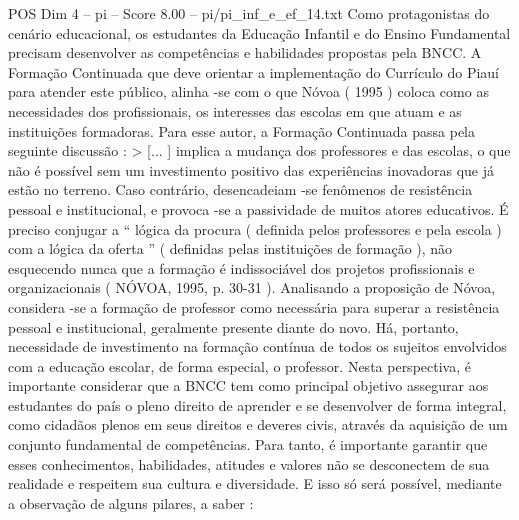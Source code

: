 \begin{textsample}{POS Dim 4 – pi – Score 8.00 – pi/pi\_inf\_e\_ef\_14.txt}
Como protagonistas do cenário educacional, os estudantes da Educação Infantil e do Ensino Fundamental precisam desenvolver as competências e habilidades propostas pela BNCC.
A Formação Continuada que deve orientar a implementação do Currículo do Piauí para atender este público, alinha -se com o que Nóvoa ( 1995 ) coloca como as necessidades dos profissionais, os interesses das escolas em que atuam e as instituições formadoras.
Para esse autor, a Formação Continuada passa pela seguinte discussão : > [... ] implica a mudança dos professores e das escolas, o que não é possível sem um investimento positivo das experiências inovadoras que já estão no terreno.
Caso contrário, desencadeiam -se fenômenos de resistência pessoal e institucional, e provoca -se a passividade de muitos atores educativos.
É preciso conjugar a “ lógica da procura ( definida pelos professores e pela escola ) com a lógica da oferta ” ( definidas pelas instituições de formação ), não esquecendo nunca que a formação é indissociável dos projetos profissionais e organizacionais ( NÓVOA, 1995, p. 30-31 ).
Analisando a proposição de Nóvoa, considera -se a formação de professor como necessária para superar a resistência pessoal e institucional, geralmente presente diante do novo.
Há, portanto, necessidade de investimento na formação contínua de todos os sujeitos envolvidos com a educação escolar, de forma especial, o professor.
Nesta perspectiva, é importante considerar que a BNCC tem como principal objetivo assegurar aos estudantes do país o pleno direito de aprender e se desenvolver de forma integral, como cidadãos plenos em seus direitos e deveres civis, através da aquisição de um conjunto fundamental de competências.
Para tanto, é importante garantir que esses conhecimentos, habilidades, atitudes e valores não se desconectem de sua realidade e respeitem sua cultura e diversidade.
E isso só será possível, mediante a observação de alguns pilares, a saber :

\end{textsample}

